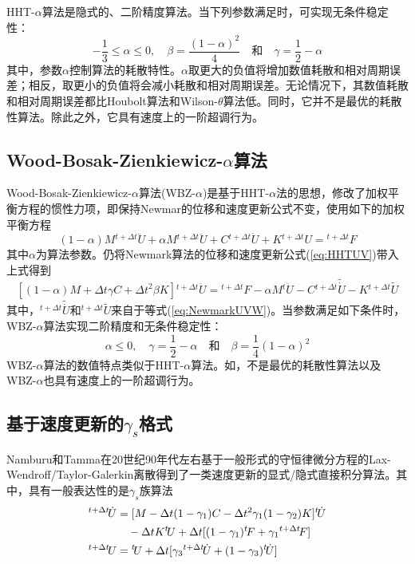 HHT-$\alpha$算法是隐式的、二阶精度算法。当下列参数满足时，可实现无条件稳定性：
\begin{equation}
-\frac{1}{3}\le\alpha\le0,\quad\beta=\frac{(1-\alpha)^2}{4}\quad\text{和}\quad\gamma=\frac{1}{2}-\alpha
\end{equation}
其中，参数$\alpha$控制算法的耗散特性。$\alpha$取更大的负值将增加数值耗散和相对周期误差；相反，取更小的负值将会减小耗散和相对周期误差。无论情况下，其数值耗散和相对周期误差都比Houbolt算法和Wilson-$\theta$算法低。同时，它并不是最优的耗散性算法。除此之外，它具有速度上的一阶超调行为。
\subsection{Wood-Bosak-Zienkiewicz-$\alpha$算法}
Wood-Bosak-Zienkiewicz-$\alpha$算法(WBZ-$\alpha$)\cite{Wood1980a}是基于HHT-$\alpha$法的思想，修改了加权平衡方程的惯性力项，即保持Newmar的位移和速度更新公式不变，使用如下的加权平衡方程
\begin{equation}
(1-\alpha)M{^{t+\Delta t}\!\ddot{U}}+\alpha M{^{t+\Delta t}\!\ddot{U}}+C{^{t+\Delta t}\!\dot{U}}+K{^{t+\Delta t}\!U}={^{t+\Delta t}\!F}
\end{equation}
其中$\alpha$为算法参数。仍将Newmark算法的位移和速度更新公式(\ref{eq:HHTUV})带入上式得到
\begin{equation}
\left[(1-\alpha)M+\Delta t\gamma C+\Delta t^2\beta K\right]{^{t+\Delta t}\!\ddot{U}}={^{t+\Delta t}\!F}-\alpha M{^{t}\!\ddot{U}}-C{^{t+\Delta t}\!\widetilde{\dot{U}}}-K{^{t+\Delta t}\!\widetilde{U}}
\end{equation}
其中，${^{t+\Delta t}\!\widetilde{\dot{U}}}$和${^{t+\Delta t}\!\widetilde{U}}$来自于等式(\ref{eq:NewmarkUVW})。当参数满足如下条件时，WBZ-$\alpha$算法实现二阶精度和无条件稳定性：
\begin{equation}
\alpha\le0,\quad\gamma=\frac{1}{2}-\alpha\quad\text{和}\quad\beta=\frac{1}{4}(1-\alpha)^2
\end{equation}
WBZ-$\alpha$算法的数值特点类似于HHT-$\alpha$算法。如，不是最优的耗散性算法以及WBZ-$\alpha$也具有速度上的一阶超调行为。

\subsection{基于速度更新的$\gamma_s$格式}
Namburu和Tamma在20世纪90年代左右基于一般形式的守恒律微分方程的Lax-Wendroff/Taylor-Galerkin离散得到了一类速度更新的显式/隐式直接积分算法\cite{Tamma1988,Tamma1988c,Tamma1989,Tamma1990a,Tamma1990,Tamma1992,Namburu1992}。其中，具有一般表达性的是$\gamma_s$族算法\cite{Namburu1992}
\begin{align}
[M+\Delta t\gamma_1C+\Delta t^2\gamma_1\gamma_2K]{^{t+\Delta t}\!\dot{U}}&=[M-\Delta t(1-\gamma_1)C-\Delta t^2\gamma_1(1-\gamma_2)K]{^t\!\dot{U}}\notag\\
&\quad -\Delta tK{^t\!U}+\Delta t[(1-\gamma_1){^t\!F}+\gamma_1{^{t+\Delta t}\!F}]\\
{^{t+\Delta t}\!U}&={^t\!U}+\Delta t[\gamma_3{^{t+\Delta t}\!\dot{U}}+(1-\gamma_3){^t\!\dot{U}}]\label{eq:TammaU}
\end{align}

